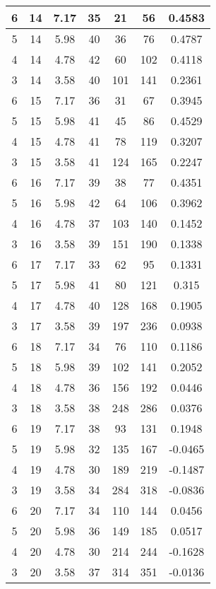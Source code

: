 \documentclass[letterpaper, 12pt]{article}
\begin{document}
\begin{longtable}{|c|c|c|c|c|c|c|}
\hline
6 & 14 & 7.17 & 35 & 21 & 56 & 0.4583 \\
\hline
5 & 14 & 5.98 & 40 & 36 & 76 & 0.4787 \\
\hline
4 & 14 & 4.78 & 42 & 60 & 102 & 0.4118 \\
\hline
3 & 14 & 3.58 & 40 & 101 & 141 & 0.2361 \\
\hline
6 & 15 & 7.17 & 36 & 31 & 67 & 0.3945 \\
\hline
5 & 15 & 5.98 & 41 & 45 & 86 & 0.4529 \\
\hline
4 & 15 & 4.78 & 41 & 78 & 119 & 0.3207 \\
\hline
3 & 15 & 3.58 & 41 & 124 & 165 & 0.2247 \\
\hline
6 & 16 & 7.17 & 39 & 38 & 77 & 0.4351 \\
\hline
5 & 16 & 5.98 & 42 & 64 & 106 & 0.3962 \\
\hline
4 & 16 & 4.78 & 37 & 103 & 140 & 0.1452 \\
\hline
3 & 16 & 3.58 & 39 & 151 & 190 & 0.1338 \\
\hline
6 & 17 & 7.17 & 33 & 62 & 95 & 0.1331 \\
\hline
5 & 17 & 5.98 & 41 & 80 & 121 & 0.315 \\
\hline
4 & 17 & 4.78 & 40 & 128 & 168 & 0.1905 \\
\hline
3 & 17 & 3.58 & 39 & 197 & 236 & 0.0938 \\
\hline
6 & 18 & 7.17 & 34 & 76 & 110 & 0.1186 \\
\hline
5 & 18 & 5.98 & 39 & 102 & 141 & 0.2052 \\
\hline
4 & 18 & 4.78 & 36 & 156 & 192 & 0.0446 \\
\hline
3 & 18 & 3.58 & 38 & 248 & 286 & 0.0376 \\
\hline
6 & 19 & 7.17 & 38 & 93 & 131 & 0.1948 \\
\hline
5 & 19 & 5.98 & 32 & 135 & 167 & -0.0465 \\
\hline
4 & 19 & 4.78 & 30 & 189 & 219 & -0.1487 \\
\hline
3 & 19 & 3.58 & 34 & 284 & 318 & -0.0836 \\
\hline
6 & 20 & 7.17 & 34 & 110 & 144 & 0.0456 \\
\hline
5 & 20 & 5.98 & 36 & 149 & 185 & 0.0517 \\
\hline
4 & 20 & 4.78 & 30 & 214 & 244 & -0.1628 \\
\hline
3 & 20 & 3.58 & 37 & 314 & 351 & -0.0136 \\
\hline
\end{longtable}
\end{document}
